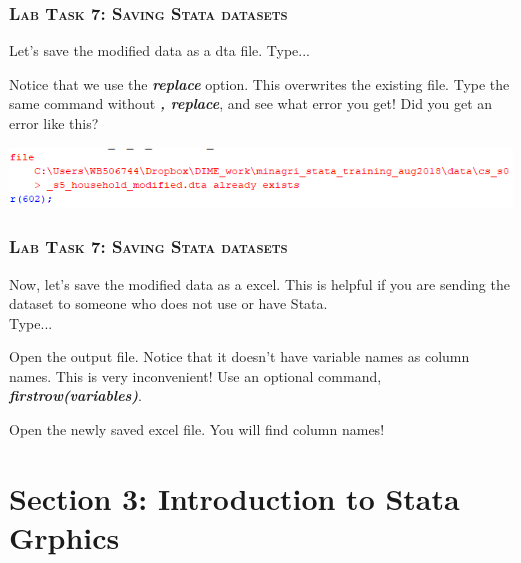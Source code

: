 \documentclass[10pt]{beamer}
\begin{document}
	\begin{frame}
		\frametitle{\textsc{Lab Task 7: Saving Stata datasets}}	
		 Let's save the modified data as a dta file.
					\vspace{2mm} Type...
\begin{stlog}\end{stlog}
		\vspace{2mm}
		 Notice that we use the \textbf{\textit{replace}} option. 
					 This overwrites the existing file. 
					 \vspace{2mm} Type the same command without \textbf{\textit{, replace}}, 
					 and see what error you get! 
		\vspace{2mm}			 
		\onslide<3-> Did you get an error like this? 
		\begin{centering}			
			\includegraphics[width=0.8\linewidth]{error_save_existing}
		\end{centering}
	\end{frame}
	
	\begin{frame}
		\frametitle{\textsc{Lab Task 7: Saving Stata datasets}}
		 Now, let's save the modified data as a excel. 
					 This is helpful if you are sending the dataset to 
					 someone who does not use or have Stata. \\
					 Type...
		\vspace{2mm}
\begin{stlog}\end{stlog}
		\vspace{2mm}
		 Open the output file. 
					 Notice that it doesn't have variable names as column names.
					 This is very inconvenient!
		\onslide<3-> Use an optional command, \textbf{\textit{firstrow(variables)}}.
		\vspace{2mm}
\begin{stlog}\end{stlog}
		\vspace{2mm}
		 Open the newly saved excel file. You will find column names!
	\end{frame}
	
	
	\section{Section 3: Introduction to Stata Grphics}
	
\end{document}
